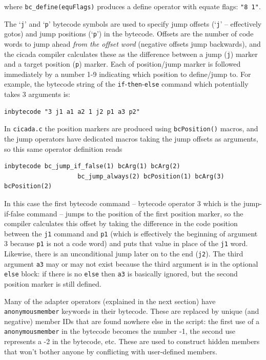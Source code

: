 \documentclass{article}
\newenvironment{code}{
       \begin{list}{}{
               \setlength{\leftmargin}{.4in}
               \setlength{\rightmargin}{0in}
               \setlength{\topsep}{.2in}
       }
       \small
       \item[] }
       { \end{list}   }
\begin{document}
\noindent where \verb#bc_define(equFlags)# produces a define operator with equate flags:  \verb#"8 1"#.

The `\verb#j#' and `\verb#p#' bytecode symbols are used to specify jump offsets (`\verb#j#' -- effectively gotos) and jump positions (`\verb#p#') in the bytecode.  Offsets are the number of code words to jump ahead \emph{from the offset word} (negative offsets jump backwards), and the cicada compiler calculates these as the difference between a jump (\verb#j#) marker and a target position (\verb#p#) marker.  Each of position/jump marker is followed immediately by a number 1-9 indicating which position to define/jump to.  For example, the bytecode string of the \verb#if#-\verb#then#-\verb#else# command which potentially takes 3 arguments is:

\begin{code} \begin{verbatim}
inbytecode "3 j1 a1 a2 1 j2 p1 a3 p2"
\end{verbatim} \end{code}

\noindent In \verb#cicada.c# the position markers are produced using \verb#bcPosition()# macros, and the jump operators have dedicated macros taking the jump offsets as arguments, so this same operator definition reads

\begin{code} \begin{verbatim}
inbytecode bc_jump_if_false(1) bcArg(1) bcArg(2)
                    bc_jump_always(2) bcPosition(1) bcArg(3) bcPosition(2)
\end{verbatim} \end{code}

\noindent In this case the first bytecode command -- bytecode operator 3 which is the jump-if-false command -- jumps to the position of the first position marker, so the compiler calculates this offset by taking the difference in the code position between the \verb#j1# command and \verb#p1# (which is effectively the beginning of argument 3 because \verb#p1# is not a code word) and puts that value in place of the \verb#j1# word.  Likewise, there is an unconditional jump later on to the end (\verb#j2#).  The third argument \verb#a3# may or may not exist because the third argument is in the optional \verb#else# block:  if there is no \verb#else# then \verb#a3# is basically ignored, but the second position marker is still defined.

Many of the adapter operators (explained in the next section) have \verb#anonymousmember# keywords in their bytecode.  These are replaced by unique (and negative) member IDs that are found nowhere else in the script:  the first use of a \verb#anonymousmember# in the bytecode becomes the number -1, the second use represents a -2 in the bytecode, etc.  These are used to construct hidden members that won't bother anyone by conflicting with user-defined members.
\end{document}

